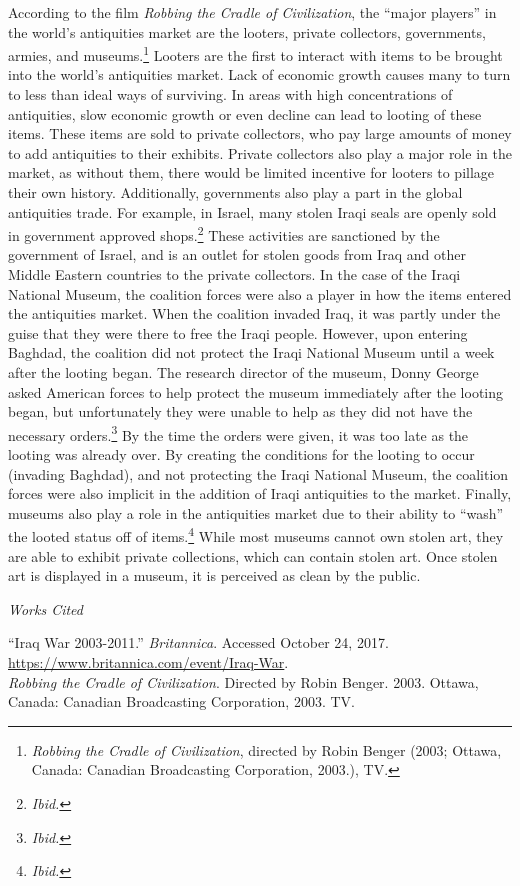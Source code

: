 \documentclass[11pt]{article}
\newenvironment{bib}[1]
  {\begin{list}
          {}
          {\setlength{\itemindent}{-#1}
           \setlength{\leftmargin}{#1}
           \setlength{\itemsep}{0pt}
           \setlength{\parsep}{\parskip}
           \setlength{\topsep}{\parskip}
           }
    \setlength{\parindent}{-#1}
    \item[]
  }
  {\end{list}}
\begin{document}
According to the film \textit{Robbing the Cradle of Civilization}, the ``major players'' in the world's antiquities market are the looters, private collectors, governments, armies, and museums.\footnote{\textit{Robbing the Cradle of Civilization}, directed by Robin Benger (2003; Ottawa, Canada: Canadian Broadcasting Corporation, 2003.), TV.} Looters are the first to interact with items to be brought into the world's antiquities market. Lack of economic growth causes many to turn to less than ideal ways of surviving. In areas with high concentrations of antiquities, slow economic growth or even decline can lead to looting of these items. These items are sold to private collectors, who pay large amounts of money to add antiquities to their exhibits. Private collectors also play a major role in the market, as without them, there would be limited incentive for looters to pillage their own history. Additionally, governments also play a part in the global antiquities trade. For example, in Israel, many stolen Iraqi seals are openly sold in government approved shops.\footnote{\textit{Ibid.}} These activities are sanctioned by the government of Israel, and is an outlet for stolen goods from Iraq and other Middle Eastern countries to the private collectors. In the case of the Iraqi National Museum, the coalition forces were also a player in how the items entered the antiquities market. When the coalition invaded Iraq, it was partly under the guise that they were there to free the Iraqi people. However, upon entering Baghdad, the coalition did not protect the Iraqi National Museum until a week after the looting began. The research director of the museum, Donny George asked American forces to help protect the museum immediately after the looting began, but unfortunately they were unable to help as they did not have the necessary orders.\footnote{\textit{Ibid.}} By the time the orders were given, it was too late as the looting was already over. By creating the conditions for the looting to occur (invading Baghdad), and not protecting the Iraqi National Museum, the coalition forces were also implicit in the addition of Iraqi antiquities to the market. Finally, museums also play a role in the antiquities market due to their ability to ``wash'' the looted status off of items.\footnote{\textit{Ibid.}} While most museums cannot own stolen art, they are able to exhibit private collections, which can contain stolen art. Once stolen art is displayed in a museum, it is perceived as clean by the public.

\newpage
\singlespacing
\begin{center}
{\large\textit{Works Cited}}
\end{center}

\begin{bib}{2em}
``Iraq War 2003-2011.'' \textit{Britannica}. Accessed October 24, 2017. \url{https://www.britannica.com/event/Iraq-War}. \\

\textit{Robbing the Cradle of Civilization}. Directed by Robin Benger. 2003. Ottawa, Canada: Canadian Broadcasting Corporation, 2003. TV.
\end{bib}
\end{document}
